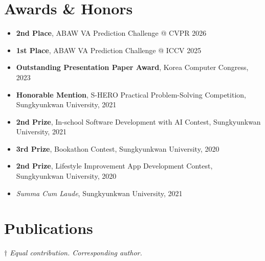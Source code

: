 \documentclass[10pt,a4paper]{article}
\begin{document}
\section*{Awards \& Honors}
\begin{itemize}[leftmargin=*,itemsep=2pt]
  \item \textbf{2nd Place}, ABAW VA Prediction Challenge @ CVPR 2026
  \item \textbf{1st Place}, ABAW VA Prediction Challenge @ ICCV 2025
  \item \textbf{Outstanding Presentation Paper Award},
    Korea Computer Congress, 2023
  \item \textbf{Honorable Mention}, S-HERO Practical Problem-Solving
    Competition, Sungkyunkwan University, 2021
  \item \textbf{2nd Prize}, In-school Software Development with AI Contest,
    Sungkyunkwan University, 2021
  \item \textbf{3rd Prize}, Bookathon Contest, Sungkyunkwan University, 2020
  \item \textbf{2nd Prize}, Lifestyle Improvement App Development Contest,
    Sungkyunkwan University, 2020
  \item \textit{Summa Cum Laude}, Sungkyunkwan University, 2021
\end{itemize}

\section*{Publications}
\small\textit{$\dagger$ Equal contribution. \quad * Corresponding author.}\normalsize\par
\vspace{4pt}
\end{document}
